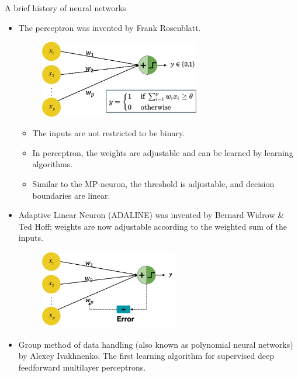 \begin{vbframe}{A brief history of neural networks}
\begin{itemize}
\item {} The perceptron was invented by Frank Rosenblatt. 
\begin{figure}
\includegraphics[width=7cm]{figure/perceptron_new.png}
\end{figure}
\begin{itemize}
\vspace{2mm}
\item The inputs are not restricted to be binary.
\vspace{2mm}
\item In perceptron, the weights are adjustable and can be learned by learning algorithms.
\vspace{2mm}
\item Similar to the MP-neuron, the threshold is adjustable, and decision boundaries are linear.
\end{itemize}
\end{itemize}
\framebreak

\begin{itemize}
\item {} Adaptive Linear Neuron (ADALINE) was invented by Bernard Widrow \& Ted Hoff; weights are now adjustable according to the weighted sum of the inputs.
\vspace{.1cm}
\begin{figure}
\includegraphics[width=6cm]{figure/adaline.png}
\end{figure}
\vspace{1cm}
\item {} Group method of data handling (also known as polynomial neural networks) by Alexey Ivakhnenko. The first learning algorithm for supervised deep feedforward multilayer perceptrons.
\framebreak


\end{itemize}
\end{vbframe}

